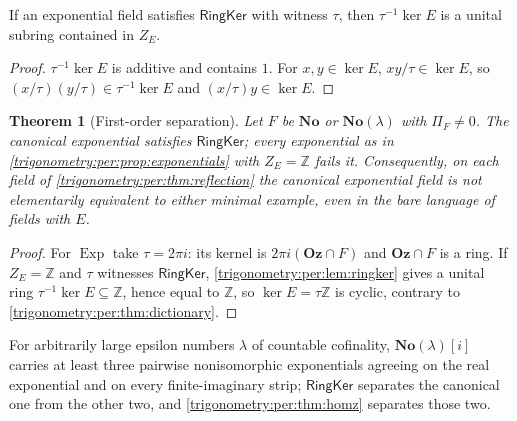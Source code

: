 \documentclass[11pt,letterpaper]{article}
\numberwithin{equation}{section}
\newtheorem{theorem}{Theorem}[section]
\theoremstyle{definition}
\theoremstyle{remark}
\newcommand{\No}{\mathbf{No}}
\newcommand{\Oz}{\mathbf{Oz}}
\newcommand{\Z}{\mathbb Z}
\newcommand{\Exp}{\operatorname{Exp}}
\begin{document}
\begin{lemma}\label{trigonometry:per:lem:ringker}
If an exponential field satisfies $\mathsf{RingKer}$ with witness $\tau$, then $\tau^{-1}\ker E$ is a
unital subring contained in $Z_E$.
\end{lemma}
\begin{proof}
$\tau^{-1}\ker E$ is additive and contains $1$. For $x,y\in\ker E$, $xy/\tau\in\ker E$, so
$(x/\tau)(y/\tau)\in\tau^{-1}\ker E$ and $(x/\tau)y\in\ker E$.
\end{proof}

\begin{theorem}[First-order separation]\label{trigonometry:per:thm:firstorder}
Let $F$ be $\No$ or $\No(\lambda)$ with $\Pi_F\ne0$. The canonical exponential satisfies
$\mathsf{RingKer}$; every exponential as in \cref{trigonometry:per:prop:exponentials} with $Z_E=\Z$
fails it. Consequently, on each field of \cref{trigonometry:per:thm:reflection} the canonical
exponential field is not elementarily equivalent to either minimal example, even in the bare language of
fields with $E$.
\end{theorem}
\begin{proof}
For $\Exp$ take $\tau=2\pi i$: its kernel is $2\pi i(\Oz\cap F)$ and $\Oz\cap F$ is a ring. If $Z_E=\Z$
and $\tau$ witnesses $\mathsf{RingKer}$, \cref{trigonometry:per:lem:ringker} gives a unital ring
$\tau^{-1}\ker E\subseteq\Z$, hence equal to $\Z$, so $\ker E=\tau\Z$ is cyclic, contrary to
\cref{trigonometry:per:thm:dictionary}.
\end{proof}

\begin{corollary}\label{trigonometry:per:cor:three}
For arbitrarily large epsilon numbers $\lambda$ of countable cofinality, $\No(\lambda)[i]$ carries at
least three pairwise nonisomorphic exponentials agreeing on the real exponential and on every
finite-imaginary strip; $\mathsf{RingKer}$ separates the canonical one from the other two, and
\cref{trigonometry:per:thm:homz} separates those two.
\end{corollary}
\end{document}
